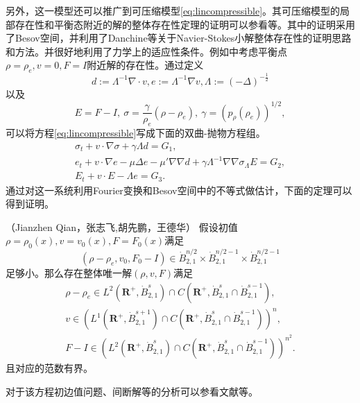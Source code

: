 另外，这一模型还可以推广到可压缩模型\eqref{eq:lincompressible}。其可压缩模型的局部存在性和平衡态附近的解的整体存在性定理的证明可以参看\cite{qian2010global,hu2011global,hu2012strong}等。其中的证明采用了Besov空间，并利用了Danchine等关于Navier-Stokes小解整体存在性的证明思路和方法\cite{danchin2000global}。并很好地利用了力学上的适应性条件。例如\cite{qian2010global}中考虑平衡点$\rho=\rho_e,v=0,F=I$附近解的存在性。通过定义
\begin{equation*}
	d:=\Lambda^{-1} \nabla \cdot v, e:= \Lambda^{-1} \nabla v, \Lambda :=(-\Delta)^{-\frac{1}{2}}
\end{equation*}
以及
\begin{equation*}
	E=F-I, \ \sigma = \frac{\gamma}{\rho_e} (\rho - \rho_e), \ \gamma = (p_{\rho}(\rho_e))^{1/2},
\end{equation*}
可以将方程\eqref{eq:lincompressible}写成下面的双曲-抛物方程组。
\begin{eqnarray*}
	\sigma_t + v \cdot \nabla \sigma + \gamma \Lambda d = G_1, \\
	e_t + v \cdot \nabla e - \mu \Delta e - \mu' \nabla \nabla d + \gamma \Lambda^{-1} \nabla \nabla \sigma _ \Lambda E = G_2, \\
	E_t + v \cdot E - \Lambda e = G_3.
\end{eqnarray*}
通过对这一系统利用Fourier变换和Besov空间中的不等式做估计，下面的定理可以得到证明。
\begin{theorem}（Jianzhen Qian，张志飞\cite{qian2010global},胡先鹏，王德华\cite{hu2011global}）
	假设初值$\rho=\rho_0(x),v=v_0(x),F=F_0(x)$满足
	\begin{equation*}
		(\rho - \rho_e,v_0,F_0-I) \in \dot{B}_{2,1}^{n/2} \times \dot{B}_{2,1}^{n/2-1} \times \dot{B}_{2,1}^{n/2-1}
	\end{equation*}
	足够小。那么存在整体唯一解$(\rho,v,F)$满足
	\begin{eqnarray*}
		\rho - \rho_e \in L^2(\mathbf{R}^+,\dot{B}_{2,1}^s) \cap C(\mathbf{R}^+,\dot{B}_{2,1}^s\cap \dot{B}_{2,1}^{s-1}),\\
		v \in \left( L^1(\mathbf{R}^+,\dot{B}_{2,1}^{s+1}) \cap C(\mathbf{R}^+,\dot{B}_{2,1}^s \cap \dot{B}_{2,1}^{s-1}) \right)^n, \\
		F- I \in \left( L^2(\mathbf{R}^+,\dot{B}_{2,1}^s) \cap C(\mathbf{R}^+,\dot{B}_{2,1}^s \cap \dot{B}_{2,1}^{s-1}) \right)^{n^2}.
	\end{eqnarray*}
	且对应的范数有界。
\end{theorem}

对于该方程初边值问题、间断解等的分析可以参看文献\cite{qian2011initial,lin2008initial,lei2010remarks,hu2012formation,hu2015global}等。

